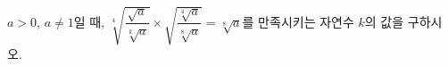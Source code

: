 $a>0$, $a\ne1$일 때, $\sqrt[4]{\dfrac{\sqrt{a}}{\sqrt[k]{a}}}\times\sqrt{\dfrac{\sqrt[4]{a}}{\sqrt[8]{a}}}=\sqrt[8]{a}$를 만족시키는 자연수 $k$의 값을 구하시오. 
